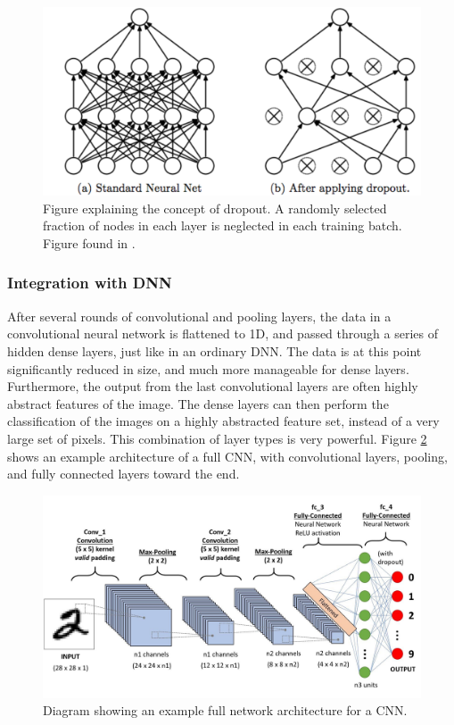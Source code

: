 \documentclass[10pt, twocolumn]{article}
\begin{document}
\begin{figure}[H]
    \centering
    \includegraphics[scale=0.2]{../figs/dropout.png}
    \caption{Figure explaining the concept of dropout. A randomly selected fraction of nodes in each layer is neglected in each training batch. Figure found in \cite{dropout}.}
    \label{fig:dropout}
\end{figure}


\subsubsection{Integration with DNN}\label{subsubec:integration_dnn}
After several rounds of convolutional and pooling layers, the data in a convolutional neural network is flattened to 1D, and passed through a series of hidden dense layers, just like in an ordinary DNN. The data is at this point significantly reduced in size, and much more manageable for dense layers. Furthermore, the output from the last convolutional layers are often highly abstract features of the image. The dense layers can then perform the classification of the images on a highly abstracted feature set, instead of a very large set of pixels. This combination of layer types is very powerful. Figure \ref{fig:network} shows an example architecture of a full CNN, with convolutional layers, pooling, and fully connected layers toward the end.

\begin{figure}[H]
    \centering
    \includegraphics[scale=0.165]{../figs/network.jpeg}
    \caption{Diagram showing an example full network architecture for a CNN.}
    \label{fig:network}
\end{figure}
\end{document}
